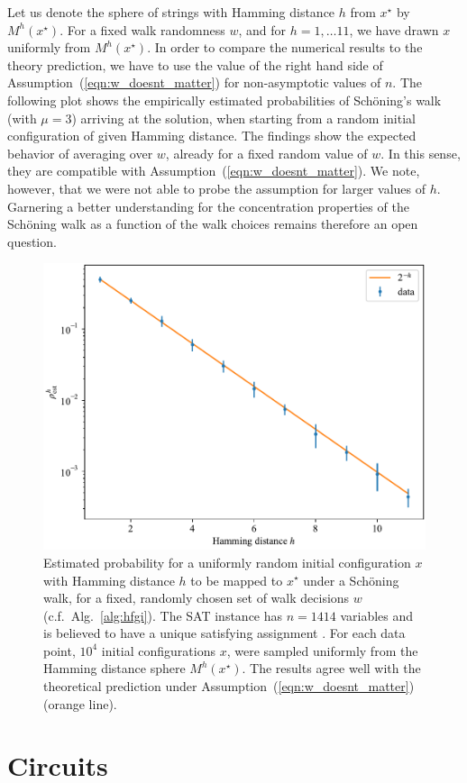 \documentclass[a4paper,aps,floatfix]{revtex4}
\begin{document}
Let us denote the sphere of strings with Hamming distance $h$ from $x^\star$ by $M^h(x^\star)$. For a fixed walk randomness $w$, and for $h=1, \dots 11$, we have drawn $x$ uniformly from $M^h(x^\star)$.
In order to compare the numerical results to the theory prediction, we have to use the value of the right hand side of Assumption~(\ref{eqn:w_doesnt_matter}) for non-asymptotic values of $n$.
The following plot shows the empirically estimated probabilities of Sch\"oning's walk (with $\mu=3$) arriving at the solution, when starting from a random initial configuration of given Hamming distance.
The findings show the expected behavior of averaging over $w$, already for a fixed random value of $w$.
In this sense, they are compatible with Assumption~(\ref{eqn:w_doesnt_matter}).
We note, however, that we were not able to probe the assumption for larger values of $h$.
Garnering a better understanding for the concentration properties of the Sch\"oning walk as a function of the walk choices remains therefore an open question.

\begin{figure}[ht]
    \centering
    \includegraphics[width=.45\textwidth]{images/runtime_1414_same_choice_for_every_clause.pdf}
   \caption{\label{fig:runtime_1414}
		 Estimated probability for a uniformly random initial configuration $x$ with Hamming distance $h$ to be mapped to $x^\star$ under a Sch\"oning walk, for a fixed, randomly chosen set of walk decisions $w$ (c.f.\ Alg.~\ref{alg:hfgi}).
		 The SAT instance has $n=1414$ variables and is believed to have a unique satisfying assignment \cite{philipp-private-commutation}.
		 For each data point, $10^4$ initial configurations $x$, were sampled uniformly from the Hamming distance sphere $M^h\left(x^\star\right)$. 
 The results agree well with the theoretical prediction under Assumption~(\ref{eqn:w_doesnt_matter}) (orange line). 
 }
\end{figure}



\section{Circuits\label{circuit}}
\end{document}

